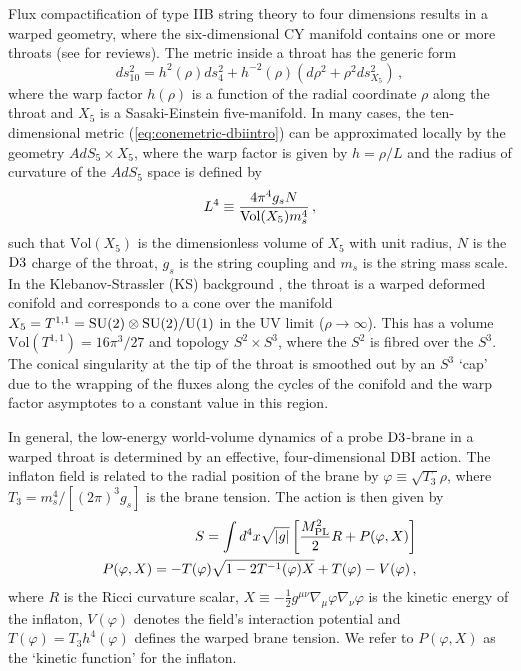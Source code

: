 Flux compactification of type IIB string theory to four dimensions 
results in a warped geometry, where the six-dimensional CY  
manifold contains one or more throats (see \cite{grana,douglas} for reviews). 
The metric inside a throat has the generic form
% 
\begin{equation}
\label{eq:conemetric-dbiintro}
ds_{10}^2= h^2 ( \rho) ds_4^2 + h^{-2} (\rho ) 
\left( d\rho^2 +\rho^2 ds_{X_5}^2 \right) \,,
\end{equation}
%  
where the warp factor $h (\rho)$ is a function of the 
radial coordinate $\rho$ along the throat and $X_5$
is a Sasaki-Einstein five-manifold. 
In many cases, the ten-dimensional metric (\ref{eq:conemetric-dbiintro}) can be 
approximated locally by the geometry $AdS_5 \times X_5$, where the 
warp factor is given by $h=\rho /L$ and 
the radius of curvature of the $AdS_5$ space is defined by
%  
\begin{equation}
L^4 \equiv \frac{4\pi^4 g_s N}{{\rm Vol} (X_5) m_s^4} \,,
\end{equation}
% 
such that $\mathrm{Vol}(X_5)$ is the dimensionless volume of 
$X_5$ with unit radius, $N$ is the ${\rm D3}$  charge of the throat, 
$g_s$ is the string coupling and $m_s$ is the string mass scale.
In the Klebanov-Strassler (KS) background \cite{ks}, the throat 
is a warped deformed conifold and 
corresponds to a cone over the manifold 
$X_5 = T^{1,1}= {\rm SU(2)} \otimes {\rm SU(2)}/{\rm U(1)}$
in the UV limit ($\rho \rightarrow \infty$). This has   
a volume $\mathrm{Vol} (T^{1,1}) = 16\pi^3/27$ and  topology
$S^2\times S^3$, where the $S^2$ is fibred over the $S^3$.
The conical singularity at the tip of the throat 
is smoothed out by an 
$S^3$ `cap' due to the wrapping of the fluxes along the cycles of the conifold
\cite{ks,kt} and the warp factor asymptotes to 
a constant value in this region.   
 

In general, the low-energy world-volume dynamics
of a probe ${\rm D3}$-brane in a warped throat is determined 
by an effective, four-dimensional DBI action. 
The inflaton field is related to the radial 
position of the brane by 
$\varphi \equiv \sqrt{T_3} \rho$, where $T_3 =m_s^4/[(2\pi )^3 g_s ]$ 
is the brane tension. The action is then given by 
% 
\begin{eqnarray}
\label{eq:DBIaction-dbiintro}
S=\int  d^4x \sqrt{|g|} \left[ \frac{M_{\mathrm{PL}}^2}{2} R 
+ P (\varphi , X) \right] \\
\label{defP}
P( \varphi ,X) = - T (\varphi)  \sqrt{1 - 2T^{-1} (\varphi ) X}
+T (\varphi)  -V(\varphi)  \,,
\end{eqnarray}
% 
where $R$ is the Ricci curvature scalar,
$X \equiv - \frac{1}{2} g^{\mu\nu} \nabla_{\mu} \varphi \nabla_{\nu} \varphi$
is the kinetic energy of the inflaton, $V(\varphi )$ denotes 
the field's interaction 
potential and $T(\varphi ) = T_3 h^4 (\varphi )$
defines the warped brane tension. We refer to $P(\varphi , X)$ as the 
`kinetic function' for the inflaton. 


